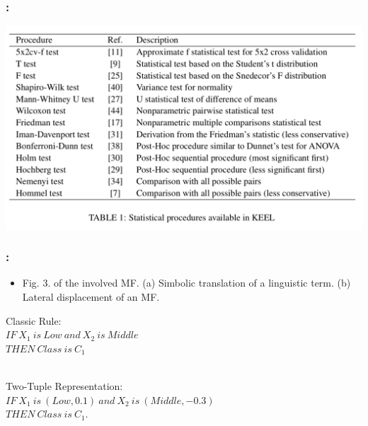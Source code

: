 \documentclass{beamer}
\begin{document}
\begin{CJK*}{UTF8}{bsmi}
\begin{frame}
	\frametitle{\insertsection : \insertsubsection}
	
\begin{center}
\includegraphics[height=.65\textheight]{./5.png}
\end{center}
\end{frame}


\begin{frame}
	\frametitle{\insertsection : \insertsubsection}
	
		\begin{itemize}
			\item Fig. 3.
			of the involved MF. (a) Simbolic translation of a linguistic term. (b) Lateral displacement of an MF.
		\end{itemize}
	\begin{block}{Classic Rule: }
		~\\
		\centering\textbf{$IF ~X_{1}~ is ~Low ~and~ X_{2}~ is~ Middle $}\\
			\centering\textbf{$THEN~ Class~ is~ C_{1}$}\\
		~\\

	\end{block}
		\begin{block}{Two-Tuple Representation:}
			~\\
			\centering\textbf{$IF ~X_{1}~ is~ (Low, 0.1)~ and ~X_{2}~ is~ (Middle, -0.3)$}\\
			\centering\textbf{$THEN ~Class~ is~C_{1} .$}\\
			~\\


\end{block}
\end{frame}
\end{CJK*}
\end{document}
